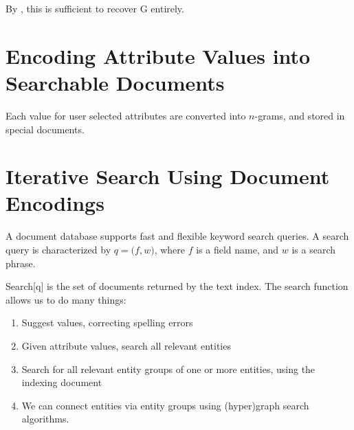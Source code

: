         By , this is sufficient to recover G entirely.
    
    \section{Encoding Attribute Values into Searchable Documents}
		Each value for user selected attributes are converted into $n$-grams, and stored in special documents.
	
	\section{Iterative Search Using Document Encodings}
		A document database supports fast and flexible keyword search queries.  A search query is characterized by $q = \bigl(f, w\bigr)$, where $f$ is a field name, and $w$ is a search phrase.
		
		Search[q] is the set of documents returned by the text index.  The search function allows us to do many things:
		
		\begin{enumerate}
			\item Suggest values, correcting spelling errors
			\item Given attribute values, search all relevant entities
			\item Search for all relevant entity groups of one or more entities, using the indexing document
			\item We can connect entities via entity groups using (hyper)graph search algorithms.
		\end{enumerate}